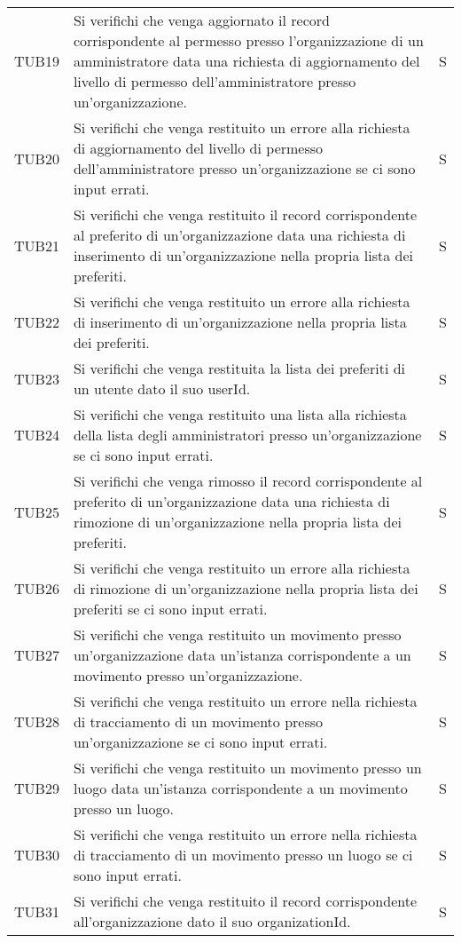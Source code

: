 {\begin{longtable}{ c C{13cm} C{1cm}}
TUB19 & Si verifichi che venga aggiornato il record corrispondente al permesso presso l'organizzazione di un amministratore data una richiesta di aggiornamento del livello di permesso dell'amministratore presso un'organizzazione. & S \\
TUB20 & Si verifichi che venga restituito un errore alla richiesta di aggiornamento del livello di permesso dell'amministratore presso un'organizzazione se ci sono input errati. & S \\
TUB21 & Si verifichi che venga restituito il record corrispondente al preferito di un'organizzazione data una richiesta di inserimento di un'organizzazione nella propria lista dei preferiti. & S \\
TUB22 & Si verifichi che venga restituito un errore alla richiesta di inserimento di un'organizzazione nella propria lista dei preferiti. & S \\
TUB23 & Si verifichi che venga restituita la lista dei preferiti di un utente dato il suo userId. & S \\
TUB24 & Si verifichi che venga restituito una lista alla richiesta della lista degli amministratori presso un'organizzazione se ci sono input errati. & S \\
TUB25 & Si verifichi che venga rimosso il record corrispondente al preferito di un'organizzazione data una richiesta di rimozione di un'organizzazione nella propria lista dei preferiti. & S \\
TUB26 & Si verifichi che venga restituito un errore alla richiesta di rimozione di un'organizzazione nella propria lista dei preferiti se ci sono input errati. & S \\
TUB27 & Si verifichi che venga restituito un movimento presso un'organizzazione data un'istanza corrispondente a un movimento presso un'organizzazione. & S \\
TUB28 & Si verifichi che venga restituito un errore nella richiesta di tracciamento di un movimento presso un'organizzazione se ci sono input errati. & S \\
TUB29 & Si verifichi che venga restituito un movimento presso un luogo data un'istanza corrispondente a un movimento presso un luogo. & S \\
TUB30 & Si verifichi che venga restituito un errore nella richiesta di tracciamento di un movimento presso un luogo se ci sono input errati. & S \\
TUB31 & Si verifichi che venga restituito il record corrispondente all'organizzazione dato il suo organizationId. & S \\

\end{longtable}}
